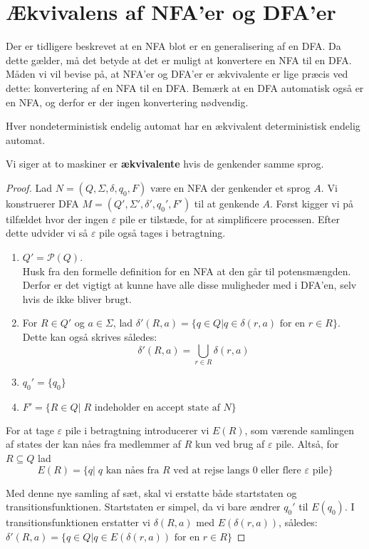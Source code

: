 \newpage
\section{Ækvivalens af NFA'er og DFA'er}
Der er tidligere beskrevet at en NFA blot er en generalisering af en DFA. Da dette gælder, må det betyde at det er muligt at konvertere en NFA til en DFA. Måden vi vil bevise på, at NFA'er og DFA'er er ækvivalente er lige præcis ved dette: konvertering af en NFA til en DFA. Bemærk at en DFA automatisk også er en NFA, og derfor er der ingen konvertering nødvendig.

\begin{theorem}
	Hver nondeterministisk endelig automat har en ækvivalent deterministisk endelig automat.
\end{theorem}

Vi siger at to maskiner er \textbf{ækvivalente} hvis de genkender samme sprog.

\begin{proof}
	Lad $N = (Q, \Sigma, \delta, q_{0}, F)$ være en NFA der genkender et sprog $A$. Vi konstruerer DFA $M = (Q', \Sigma', \delta', q_{0}', F')$ til at genkende $A$. Først kigger vi på tilfældet hvor der ingen $\varepsilon$ pile er tilstæde, for at simplificere processen. Efter dette udvider vi så $\varepsilon$ pile også tages i betragtning.
	\begin{enumerate}
		\item $Q' = \mathcal{P}(Q)$. \\ Husk fra den formelle definition for en NFA at den går til potensmængden. Derfor er det vigtigt at kunne have alle disse muligheder med i DFA'en, selv hvis de ikke bliver brugt.
		\item For $R \in Q'$ og $a \in \Sigma$, lad $\delta'(R, a) = \{q \in Q| q \in \delta(r,a) \text{ for en } r \in R\}$.\\ Dette kan også skrives således: \[\delta'(R,a)= \bigcup_{r \in R} \delta(r,a) \]
		\item $q_{0}' = \{q_{0}\}$
		\item $F' = \{R \in Q | \; R \text{ indeholder en accept state af } N\}$
	\end{enumerate}

	For at tage $\varepsilon$ pile i betragtning introducerer vi $E(R)$, som værende samlingen af states der kan nåes fra medlemmer af $R$ kun ved brug af $\varepsilon$ pile. Altså, for $R \subseteq Q$ lad \[E(R) = \{q|\; q\text{ kan nåes fra } R \text{ ved at rejse langs 0 eller flere } \varepsilon \text{ pile}\}\]

	Med denne nye samling af sæt, skal vi erstatte både startstaten og transitionsfunktionen. Startstaten er simpel, da vi bare ændrer $q_{0}'$ til $E(q_{0})$. I transitionsfunktionen erstatter vi $\delta(R,a)$ med $E(\delta(r,a))$, således:
	$\delta'(R, a) = \{q \in Q| q \in E(\delta(r,a)) \text{ for en } r \in R\}$
\end{proof}





